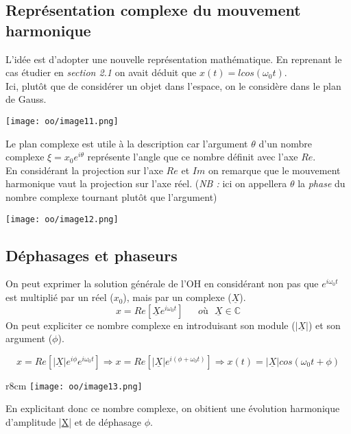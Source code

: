 \documentclass[british,french,11pt, a4paper, openany]{book}
\begin{document}
	\subsection{Représentation complexe du mouvement harmonique}
	L'idée est d'adopter une nouvelle représentation mathématique. En reprenant le cas étudier en \textit{section 2.1} on avait déduit que $x(t) = lcos(\omega_0 t)$.\\
	Ici, plutôt que de considérer un objet dans l'espace, on le considère dans le plan de Gauss.
	
	\begin{center}
		\texttt{[image: oo/image11.png]}
	\end{center}
	Le plan complexe est utile à la description car l'argument $\theta$ d'un nombre complexe $\xi = x_0e^{i\theta}$ représente l'angle que ce nombre définit avec l'axe $Re$.\\
	
	En considérant la projection sur l'axe $Re$ et $Im$ on remarque que le mouvement harmonique vaut la projection sur l'axe réel. (\textit{NB :} ici on appellera $\theta$ la \textit{phase} du nombre complexe tournant plutôt que l'argument)
	\begin{center}
		\texttt{[image: oo/image12.png]}
	\end{center}
	
	\subsection{Déphasages et phaseurs}
	On peut exprimer la solution générale de l'OH en considérant non pas que $e^{i\omega_0 t}$ est multiplié par un réel ($x_0$), mais par un complexe ($\underline{X}$).
	\begin{equation}
		x = Re\left[\underline{X}e^{i\omega_0 t}\right]\ \ \ \ \ \ \ où\ \ \ \underline{X} \in \mathbb{C}
	\end{equation}
	On peut expliciter ce nombre complexe en introduisant son module ($|\underline{X}|$) et son argument ($\phi$).
	
	\begin{equation}
		x = Re\left[|\underline{X}|e^{i\phi}e^{i\omega_0t}\right] \Rightarrow x = Re\left[|\underline{X}|e^{i(\phi + \omega_0 t)}\right] \Rightarrow x(t) = |\underline{X}|cos(\omega_0 t + \phi)
	\end{equation}
	
	\begin{wrapfigure}[21]{r}{8cm}
		\texttt{[image: oo/image13.png]}
	\end{wrapfigure}
	En explicitant donc ce nombre complexe, on obitient une évolution harmonique d'amplitude |\underline{X}| et de déphasage $\phi$.\\
	
\end{document}
